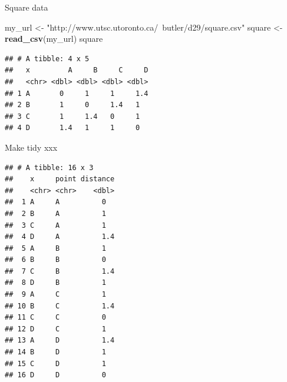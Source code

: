 \documentclass[ignorenonframetext,]{beamer}
\newenvironment{Shaded}{\begin{snugshade}}{\end{snugshade}}
\newcommand{\KeywordTok}[1]{\textcolor[rgb]{0.13,0.29,0.53}{\textbf{#1}}}
\newcommand{\NormalTok}[1]{#1}
\newcommand{\OperatorTok}[1]{\textcolor[rgb]{0.81,0.36,0.00}{\textbf{#1}}}
\newcommand{\StringTok}[1]{\textcolor[rgb]{0.31,0.60,0.02}{#1}}
\begin{document}
\begin{frame}[fragile]{Square data}
\protect\hypertarget{square-data}{}

\begin{Shaded}
\begin{Highlighting}[]
\NormalTok{my_url <-}\StringTok{ "http://www.utsc.utoronto.ca/~butler/d29/square.csv"}
\NormalTok{square <-}\StringTok{ }\KeywordTok{read_csv}\NormalTok{(my_url)}
\NormalTok{square}
\end{Highlighting}
\end{Shaded}

\begin{verbatim}
## # A tibble: 4 x 5
##   x         A     B     C     D
##   <chr> <dbl> <dbl> <dbl> <dbl>
## 1 A       0     1     1     1.4
## 2 B       1     0     1.4   1  
## 3 C       1     1.4   0     1  
## 4 D       1.4   1     1     0
\end{verbatim}

\end{frame}

\begin{frame}[fragile]{Make tidy xxx}
\protect\hypertarget{make-tidy-xxx}{}

\scriptsize

\begin{Shaded}
\end{Shaded}

\begin{verbatim}
## # A tibble: 16 x 3
##    x     point distance
##    <chr> <chr>    <dbl>
##  1 A     A          0  
##  2 B     A          1  
##  3 C     A          1  
##  4 D     A          1.4
##  5 A     B          1  
##  6 B     B          0  
##  7 C     B          1.4
##  8 D     B          1  
##  9 A     C          1  
## 10 B     C          1.4
## 11 C     C          0  
## 12 D     C          1  
## 13 A     D          1.4
## 14 B     D          1  
## 15 C     D          1  
## 16 D     D          0
\end{verbatim}

\normalsize

\end{frame}
\end{document}
